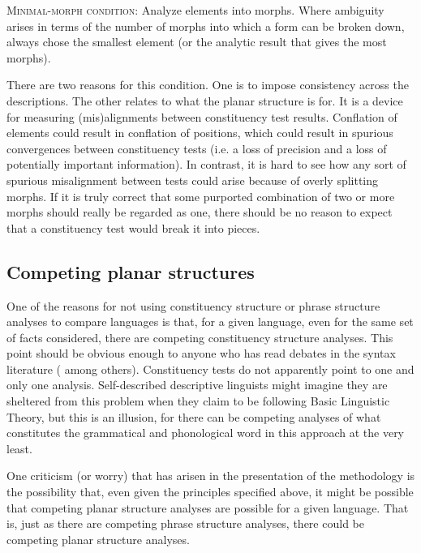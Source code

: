 \documentclass[output=paper,hidelinks]{langscibook}
\begin{document}
\ea 
    \textsc{Minimal-morph condition}: Analyze elements into morphs. Where ambiguity arises in terms of the number of morphs into which a form can be broken down, always chose the smallest element (or the analytic result that gives the most morphs).
\z 

There are two reasons for this condition. One is to impose consistency across the descriptions. The other relates to what the planar structure is for. It is a device for measuring (mis)alignments between constituency test results. Conflation of elements could result in conflation of positions, which could result in spurious convergences between constituency tests (i.e. a loss of precision and a loss of potentially important information). In contrast, it is hard to see how any sort of spurious misalignment between tests could arise because of overly splitting morphs. If it is truly correct that some purported combination of two or more morphs should really be regarded as one, there should be no reason to expect that a constituency test would break it into pieces. 

\largerpage
\subsection{Competing planar structures}
\label{sec:competing}

One of the reasons for not using constituency structure or phrase structure analyses to compare languages is that, for a given language, even for the same set of facts considered, there are competing constituency structure analyses. This point should be obvious enough to anyone who has read debates in the syntax literature (\citealt{croft_radical_2001, culicover2005simpler} among others). Constituency tests do not apparently point to one and only one analysis. Self-described descriptive linguists might imagine they are sheltered from this problem when they claim to be following Basic Linguistic Theory, but this is an illusion, for there can be competing analyses of what constitutes the grammatical and phonological word in this approach at the very least.

One criticism (or worry) that has arisen in the presentation of the methodology is the possibility that, even given the principles specified above, it might be possible that competing planar structure analyses are possible for a given language. That is, just as there are competing phrase structure analyses, there could be competing planar structure analyses. 
\end{document}
